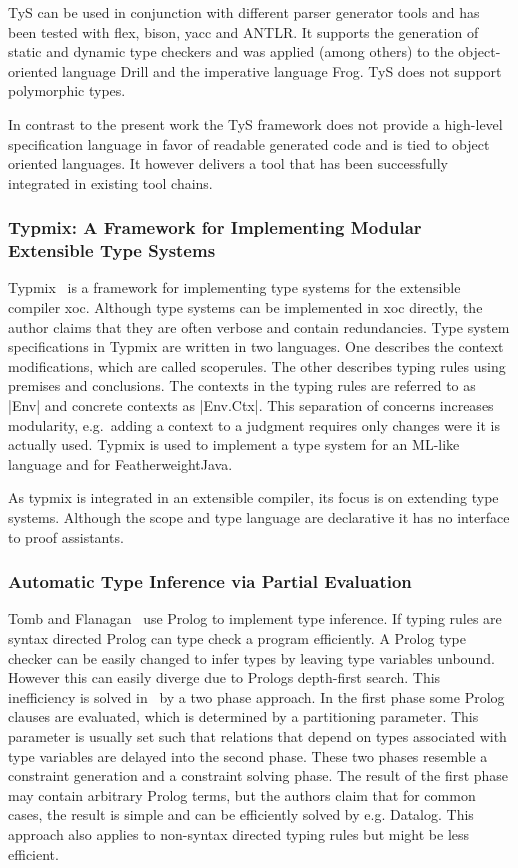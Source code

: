 TyS can be used in conjunction with different parser generator tools
and has been tested with flex, bison, yacc and ANTLR. It supports
the generation of static and dynamic type checkers and was applied
(among others) to the object-oriented language Drill and the
imperative language Frog. TyS does not support polymorphic types.

In contrast to the present work the TyS framework does not provide a
high-level specification language in favor of readable generated code
and is tied to object oriented languages. It however delivers a tool
that has been successfully integrated in existing tool chains.
\subsubsection{Typmix: A Framework for Implementing Modular Extensible Type
  Systems}
Typmix~\cite{bergan2007typmix} is a framework for implementing type
systems for the extensible compiler xoc. Although type systems can be
implemented in xoc directly, the author claims that they are often
verbose and contain redundancies. Type system specifications in Typmix
are written in two languages. One describes the context modifications,
which are called scoperules. The other describes typing rules using
premises and conclusions. The contexts in the typing rules are
referred to as \code|Env| and concrete contexts as
\code|Env.Ctx|. This separation of concerns increases modularity,
e.g.\ adding a context to a judgment requires only changes were it is
actually used. Typmix is used to implement a type system for an
ML-like language and for FeatherweightJava.

As typmix is integrated in an extensible compiler, its focus is on
extending type systems. Although the scope and type language are
declarative it has no interface to proof assistants.

\subsubsection{Automatic Type Inference via Partial Evaluation}
Tomb and Flanagan~\cite{tomb2005automatic} use Prolog to implement
type inference. If typing rules are syntax directed Prolog can type
check a program efficiently. A Prolog type checker can be easily
changed to infer types by leaving type variables unbound. However this
can easily diverge due to Prologs depth-first search. This
inefficiency is solved in~\cite{tomb2005automatic} by a two phase
approach. In the first phase some Prolog clauses are evaluated, which
is determined by a partitioning parameter. This parameter is usually
set such that relations that depend on types associated with type
variables are delayed into the second phase. These two phases resemble
a constraint generation and a constraint solving phase. The result of
the first phase may contain arbitrary Prolog terms, but the authors
claim that for common cases, the result is simple and can be
efficiently solved by e.g. Datalog. This approach also applies to
non-syntax directed typing rules but might be less efficient.

